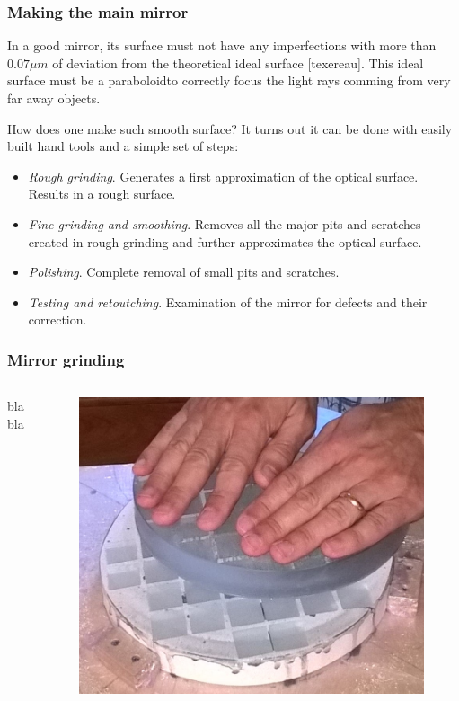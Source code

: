 \documentclass{beamer}
\begin{document}
\begin{frame}
\frametitle{Making the main mirror}
In a good mirror, its surface must not have any imperfections with more than $0.07 \mu m$ of deviation from the theoretical ideal surface [texereau].
This ideal surface must be a paraboloid\footnotemark to correctly focus the light rays comming from very far away objects.

How does one make such smooth surface? It turns out it can be done with easily built hand tools and a simple set of steps:

\begin{itemize}
\item \textit{Rough grinding}. Generates a first approximation of the optical surface. Results in a rough surface.
\item \textit{Fine grinding and smoothing}. Removes all the major pits and scratches created in rough grinding and further approximates the optical surface.
\item \textit{Polishing}. Complete removal of small pits and scratches.
\item \textit{Testing and retoutching}. Examination of the mirror for defects and their correction.
\end{itemize}
\end{frame}

\begin{frame}
\frametitle{Mirror grinding}
\begin{columns}
bla bla
\begin{figure}
\includegraphics[scale=0.2]{assets/grinding.jpg}
\end{figure}
\end{columns}
\end{frame}
\end{document}
